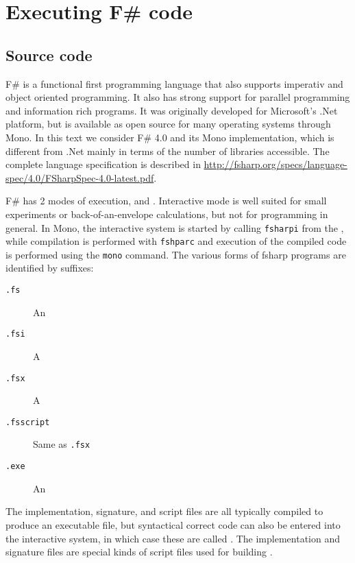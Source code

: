 \chapter{Executing F\# code}

\section{Source code}
F\# is a functional first programming language that also supports imperativ and object oriented programming. It also has strong support for parallel programming and information rich programs. It was originally developed for Microsoft's .Net platform, but is available as open source for many operating systems through Mono. In this text we consider F\# 4.0 and its Mono implementation, which is different from .Net mainly in terms of the number of libraries accessible. The complete language specification is described in \url{http://fsharp.org/specs/language-spec/4.0/FSharpSpec-4.0-latest.pdf}. 

F\# has 2 modes of execution,  and . Interactive mode is well suited for small experiments or back-of-an-envelope calculations, but not for programming in general. In Mono, the interactive system is started by calling \texttt{fsharpi} from the , while compilation is performed with \texttt{fshparc} and execution of the compiled code is performed using the \texttt{mono} command. The various forms of fsharp programs are identified by suffixes:
\begin{description}
\item[\texttt{.fs}] An 
\item[\texttt{.fsi}] A 
\item[\texttt{.fsx}] A 
\item[\texttt{.fsscript}] Same as \texttt{.fsx}
\item[\texttt{.exe}] An 
\end{description}
The implementation, signature, and script files are all typically compiled to produce an executable file, but syntactical correct code can also be entered into the interactive system, in which case these are called . The implementation and signature files are special kinds of script files used for building .

